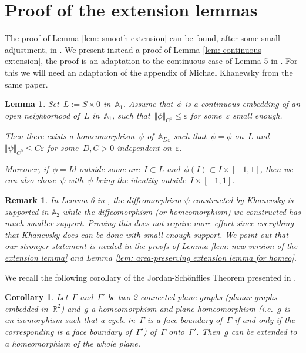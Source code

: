 \documentclass[10pt]{amsart}
\newtheorem{lemma}[prop]{Lemma}
\newtheorem{rk}[prop]{Remark}
\newtheorem{coro}{Corollary}
\begin{document}
\section{Proof of the extension lemmas}\label{sec: pf of extension lemma}

The proof of Lemma \ref{lem: smooth extension} can be found, after some small adjustment, in \cite[Section 6.4]{EPP}. We present instead a proof of Lemma \ref{lem: continuous extension}, the proof is an adaptation to the continuous case of Lemma 5 in \cite[Section 6.4]{EPP}. For this we will need an adaptation of the appendix of Michael Khanevsky from the same paper.

\begin{lemma}\label{lem: continuous Khanevsky extension}
Set~$L:=S\times 0$ in~$\mathbb{A}_1$. Assume that~$\phi$ is a continuous embedding of an open neighborhood of~$L$ in~$\mathbb{A}_1$, such that~$\Vert \phi \Vert_{C^0} \leq \varepsilon$ for some~$\varepsilon$ small enough.

Then there exists a homeomorphism~$\psi$ of~$\mathbb{A}_{D\varepsilon}$ such that~$\psi=\phi$ on~$L$ and~$\Vert \psi \Vert_{C^0} \leq C\varepsilon$ for some~$D,C>0$ independent on~$\varepsilon$.

Moreover, if~$\phi=Id$ outside some arc~$I\subset L$ and~$\phi(I)\subset I\times [-1,1]$, then we can also chose~$\psi$ with~$\psi$ being the identity outside~$I\times [-1,1]$.
\end{lemma}

\begin{rk}
In Lemma 6 in \cite{EPP}, the diffeomorphism $\psi$ constructed by Khanevsky is supported in $\mathbb A_2$ while the diffeomorphism (or homeomorphism) we constructed has much smaller support. Proving this does not require more effort since everything that Khanevsky does can be done with small enough support. We point out that our stronger statement is needed in the proofs of Lemma \ref{lem: new version of the extension lemma} and Lemma \ref{lem: area-preserving extension lemma for homeo}.
\end{rk}

We recall the following corollary of the Jordan-Schönflies Theorem presented in \cite{Thomassen}.

\begin{coro}\label{coro: JS}
Let~$\Gamma$ and~$\Gamma'$ be two 2-connected plane graphs (planar graphs embedded in~$\mathbb{R}^2$) and~$g$ a homeomorphism and plane-homeomorphism (i.e.~$g$ is an isomorphism such that a cycle in~$\Gamma$ is a face boundary of~$\Gamma$ if and only if the corresponding is a face boundary of~$\Gamma'$) of~$\Gamma$ onto~$\Gamma'$. Then~$g$ can be extended to a homeomorphism of the whole plane.
\end{coro}
\end{document}

